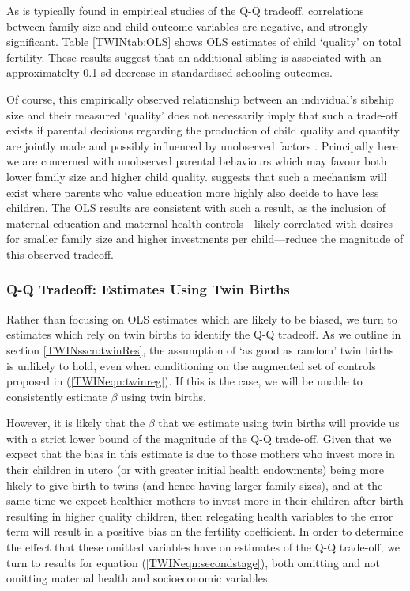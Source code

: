 As is typically found in empirical studies of the Q-Q tradeoff, correlations 
between family size and child outcome variables are negative, and strongly 
significant. Table \ref{TWINtab:OLS} shows OLS estimates of child `quality' on
total fertility. These results suggest that an additional sibling is associated
with an approximatelty 0.1 sd decrease in standardised schooling outcomes.


Of course, this empirically observed relationship between an individual's sibship 
size and their measured `quality' does not necessarily imply that such a 
trade-off exists if parental decisions regarding the production of child quality 
and quantity are jointly made and possibly influenced by unobserved factors 
\citep{BeckerTomes1976}.  Principally here we are concerned with unobserved 
parental behaviours which may favour both lower family size and higher child 
quality. \citet{Qian2009} suggests that such a mechanism will exist where parents 
who value education more highly also decide to have less children.  The OLS 
results are consistent with such a result, as the inclusion of maternal education 
and maternal health controls---likely correlated with desires for smaller 
family size and higher investments per child---reduce the magnitude of this 
observed tradeoff.

\subsubsection{Q-Q Tradeoff: Estimates Using Twin Births}
Rather than focusing on OLS estimates which are likely to be biased, we turn 
to estimates which rely on twin births to identify the Q-Q tradeoff.  As we 
outline in section \ref{TWINsscn:twinRes}, the assumption of `as good as random' 
twin births is unlikely to hold, even when conditioning on the augmented set of 
controls proposed in (\ref{TWINeqn:twinreg}).  If this is the case, we will be 
unable to consistently estimate $\beta$ using twin births.  

However, it is likely that the $\beta$ that we estimate using twin births will 
provide us with a strict lower bound of the magnitude of the Q-Q trade-off. 
Given that we expect that the bias in this estimate is due to those mothers who 
invest more in their children in utero (or with greater initial health endowments) 
being more likely to give birth to twins (and hence having larger family sizes), 
and at the same time we expect healthier mothers to invest more in their children
after birth resulting in higher quality children, then relegating health 
variables to the error term will result in a positive bias on the fertility 
coefficient.  In order to determine the effect that these omitted variables have 
on estimates of the Q-Q trade-off, we turn to results for equation
(\ref{TWINeqn:secondstage}), both omitting and not omitting maternal health and
socioeconomic variables.

